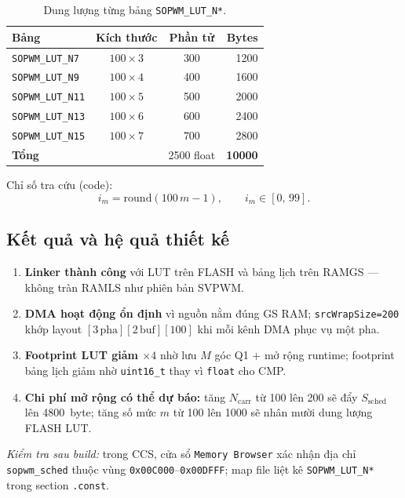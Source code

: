 \begin{table}[htbp]
  \centering
  \caption{Dung lượng từng bảng \texttt{SOPWM\_LUT\_N*}.}
  \label{tab:lut_breakdown}
  \begin{tabular}{@{}lccr@{}}
    \toprule
    Bảng & Kích thước & Phần tử & Bytes \\
    \midrule
    \texttt{SOPWM\_LUT\_N7}  & $100\times 3$ & 300  & 1200 \\
    \texttt{SOPWM\_LUT\_N9}  & $100\times 4$ & 400  & 1600 \\
    \texttt{SOPWM\_LUT\_N11} & $100\times 5$ & 500  & 2000 \\
    \texttt{SOPWM\_LUT\_N13} & $100\times 6$ & 600  & 2400 \\
    \texttt{SOPWM\_LUT\_N15} & $100\times 7$ & 700  & 2800 \\
    \midrule
    \textbf{Tổng} & & 2500 float & \textbf{10000} \\
    \bottomrule
  \end{tabular}
\end{table}

Chỉ số tra cứu (code):
\begin{equation}
  i_m = \mathrm{round}(100\,m - 1), \qquad i_m \in [0,\,99].
  \label{eq:lut_index_v3}
\end{equation}

\subsection{Kết quả và hệ quả thiết kế}

\begin{enumerate}
  \item \textbf{Linker thành công} với LUT trên FLASH và bảng lịch trên RAMGS --- không tràn RAMLS như phiên bản SVPWM.
  \item \textbf{DMA hoạt động ổn định} vì nguồn nằm đúng GS RAM; \texttt{srcWrapSize=200} khớp layout $[3\,\text{pha}][2\,\text{buf}][100]$ khi mỗi kênh DMA phục vụ một pha.
  \item \textbf{Footprint LUT giảm $\times 4$} nhờ lưu $M$ góc Q1 + mở rộng runtime; footprint bảng lịch giảm nhờ \texttt{uint16\_t} thay vì \texttt{float} cho CMP.
  \item \textbf{Chi phí mở rộng có thể dự báo:} tăng $N_{\mathrm{carr}}$ từ 100 lên 200 sẽ đẩy $S_{\mathrm{sched}}$ lên \SI{4800}{byte}; tăng số mức $m$ từ 100 lên 1000 sẽ nhân mười dung lượng FLASH LUT.
\end{enumerate}

\noindent\textit{Kiểm tra sau build:} trong CCS, cửa sổ \texttt{Memory Browser} xác nhận địa chỉ \texttt{sopwm\_sched} thuộc vùng \texttt{0x00C000}--\texttt{0x00DFFF}; map file liệt kê \texttt{SOPWM\_LUT\_N*} trong section \texttt{.const}.
